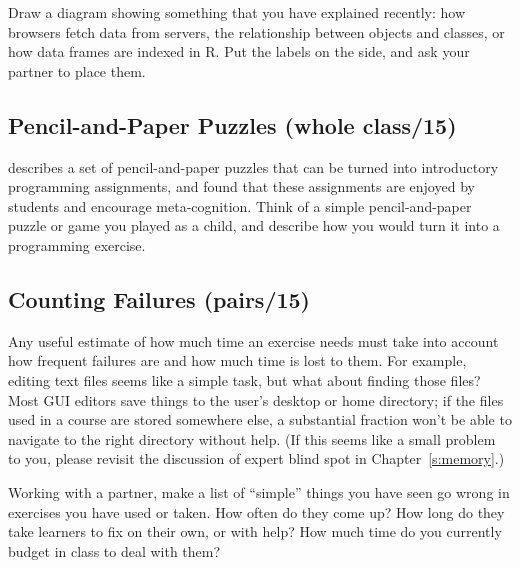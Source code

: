 Draw a diagram showing something that you have explained recently: how
browsers fetch data from servers, the relationship between objects and
classes, or how data frames are indexed in R. Put the labels on the
side, and ask your partner to place them.

\subsection*{Pencil-and-Paper Puzzles (whole class/15)}

\cite{Butl2017} describes a set of pencil-and-paper puzzles that can
be turned into introductory programming assignments, and found that
these assignments are enjoyed by students and encourage meta-cognition.
Think of a simple pencil-and-paper puzzle or game you played as a child,
and describe how you would turn it into a programming exercise.

\subsection*{Counting Failures (pairs/15)}

Any useful estimate of how much time an exercise needs must take into
account how frequent failures are and how much time is lost to them. For
example, editing text files seems like a simple task, but what about
finding those files? Most GUI editors save things to the user's desktop
or home directory; if the files used in a course are stored somewhere
else, a substantial fraction won't be able to navigate to the right
directory without help. (If this seems like a small problem to you,
please revisit the discussion of expert blind spot in
Chapter~\ref{s:memory}.)

Working with a partner, make a list of ``simple'' things you have seen go
wrong in exercises you have used or taken. How often do they come up?
How long do they take learners to fix on their own, or with help? How
much time do you currently budget in class to deal with them?
